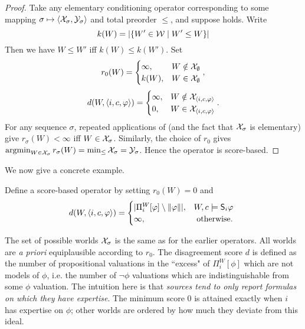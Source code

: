 \begin{proof}
    Take any elementary conditioning operator corresponding to some mapping
    $\sigma \mapsto \langle {\mathcal{X}_\sigma, \mathcal{Y}_\sigma} \rangle$ and total preorder $\le$, and
    suppose \kconj{} holds. Write
    \[
        k(W) = |\{W' \in \mathcal{W} \mid W' \le W\}|
    \]
    Then we have $W \le W'$ iff $k(W) \le k(W')$. Set
    \[
        r_0(W) = \begin{cases}
            \infty,& W \notin \mathcal{X}_\emptyset \\
            k(W),& W \in \mathcal{X}_\emptyset
        \end{cases},
    \]
    \[
        d(W, \langle {i, c, \varphi} \rangle) = \begin{cases}
            \infty,& W \notin \mathcal{X}_{\langle {i, c, \varphi} \rangle} \\
            0,& W \in \mathcal{X}_{\langle {i, c, \varphi} \rangle} \\
        \end{cases}.
    \]
    For any sequence $\sigma$, repeated applications of \kconj{} (and the fact
    that $\mathcal{X}_\sigma$ is elementary) give $r_\sigma(W) < \infty$ iff $W \in
    \mathcal{X}_\sigma$. Similarly, the choice of $r_0$ gives $\operatorname{argmin}_{W \in
    \mathcal{X}_\sigma}{r_\sigma(W)} = \min_{\le}{\mathcal{X}_\sigma} = \mathcal{Y}_\sigma$. Hence the
    operator is score-based.

\end{proof}

We now give a concrete example.

\begin{definition}
    \label{kr_def_scorebasedop}
    Define a score-based operator \scorebasedop{} by setting
    $r_0(W) = 0$ and
    \[
        d(W, \langle {i, c, \varphi} \rangle) = \begin{cases}
            |\Pi^W_i[\varphi] \setminus \|{\varphi}\||,& W, c \models \mathsf{S}_i\varphi \\
            \infty,& \text{ otherwise. }
        \end{cases}
    \]
\end{definition}

The set of possible worlds $\mathcal{X}_\sigma$ is the same as for the earlier
operators.
All worlds are \emph{a priori} equiplausible according to
$r_0$. The disagreement score $d$ is defined as the number of propositional
valuations in the ``excess" of $\Pi^W_i[\phi]$ which are not models of
$\phi$, i.e. the number of $\neg\phi$ valuations which are indistinguishable
from some $\phi$ valuation.
%
The intuition here is that \emph{sources tend to only report formulas on which
they have expertise}. The minimum score 0 is attained exactly when $i$ has
expertise on $\phi$; other worlds are ordered by how much they deviate from
this ideal.

